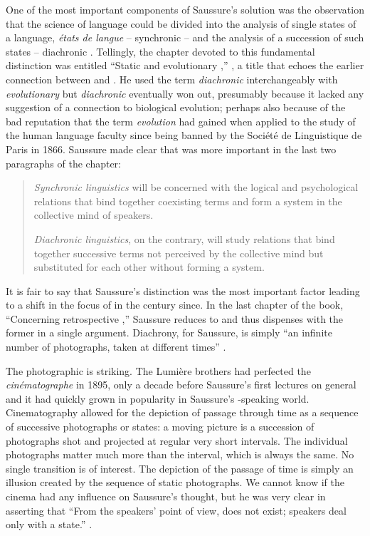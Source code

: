\documentclass[output=paper,
modfonts
]{LSP/langsci}
\begin{document}
One of the most important components of Saussure's solution was the observation that the science of language could be divided into the analysis of single states of a language, \textit{états de langue} -- synchronic  -- and the analysis of a succession of such states -- diachronic . Tellingly, the chapter devoted to this fundamental distinction was entitled ``Static and evolutionary ,'' \citep[79]{Saussure1959}, a title that echoes the earlier connection between  and . He used the term \textit{diachronic} interchangeably with \textit{evolutionary} but \textit{diachronic} eventually won out, presumably because it lacked any suggestion of a connection to biological evolution; perhaps also because of the bad reputation that the term \textit{evolution} had gained when applied to the study of the human language faculty since being banned by the Société de Linguistique de Paris in 1866.  Saussure made clear that  was more important in the last two paragraphs of the chapter:

\begin{quote}
\textit{Synchronic linguistics} will be concerned with the logical and psychological relations that bind together coexisting terms and form a system in the collective mind of speakers.

\textit{Diachronic linguistics}, on the contrary, will study relations that bind together successive terms not perceived by the collective mind but substituted for each other without forming a system.
\end{quote}

It is fair to say that Saussure's distinction was the most important factor leading to a shift in the focus of  in the century since.  In the last chapter of the book, ``Concerning retrospective ,'' Saussure reduces  to  and thus dispenses with the former in a single argument.  Diachrony, for Saussure, is simply ``an infinite number of photographs, taken at different times'' \citep[212]{Saussure1959}.

The photographic  is striking.  The Lumière brothers had perfected the \textit{cinématographe} in 1895, only a decade before Saussure's first lectures on general  and it had quickly grown in popularity in Saussure's -speaking world. Cinematography allowed for the depiction of passage through time as a sequence of successive photographs or states: a moving picture is a succession of photographs shot and projected at regular very short intervals. The individual photographs matter much more than the interval, which is always the same.  No single transition is of interest. The depiction of the passage of time is simply an illusion created by the sequence of static photographs. We cannot know if the cinema had any influence on Saussure's thought, but he was very clear in asserting that ``From the speakers' point of view,  does not exist; speakers deal only with a state.'' \citep[594]{Joseph2012}.
\end{document}
